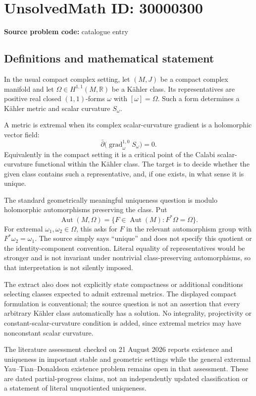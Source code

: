 \documentclass[11pt]{article}
\newcommand{\R}{\mathbb{R}}
\begin{document}
\section*{UnsolvedMath ID: 30000300}
\textbf{Source problem code:} catalogue entry
\subsection{Definitions and mathematical statement}
In the usual compact complex setting, let $(M,J)$ be a compact complex manifold and let $\Omega\in H^{1,1}(M,\R)$ be a K\"ahler class. Its representatives are positive real closed $(1,1)$-forms $\omega$ with $[\omega]=\Omega$. Such a form determines a K\"ahler metric and scalar curvature $S_\omega$.

A metric is extremal when its complex scalar-curvature gradient is a holomorphic vector field:
\[
 \bar\partial\bigl(\operatorname{grad}^{1,0}_{\omega}S_\omega\bigr)=0.
\]
Equivalently in the compact setting it is a critical point of the Calabi scalar-curvature functional within the K\"ahler class. The target is to decide whether the given class contains such a representative, and, if one exists, in what sense it is unique.

The standard geometrically meaningful uniqueness question is modulo holomorphic automorphisms preserving the class. Put
\[
 \operatorname{Aut}(M,\Omega)=\{F\in\operatorname{Aut}(M):F^*\Omega=\Omega\}.
\]
For extremal $\omega_1,\omega_2\in\Omega$, this asks for $F$ in the relevant automorphism group with $F^*\omega_2=\omega_1$. The source simply says ``unique'' and does not specify this quotient or the identity-component convention. Literal equality of representatives would be stronger and is not invariant under nontrivial class-preserving automorphisms, so that interpretation is not silently imposed.

The extract also does not explicitly state compactness or additional conditions selecting classes expected to admit extremal metrics. The displayed compact formulation is conventional; the source question is not an assertion that every arbitrary K\"ahler class automatically has a solution. No integrality, projectivity or constant-scalar-curvature condition is added, since extremal metrics may have nonconstant scalar curvature.

The literature assessment checked on 21 August 2026 reports existence and uniqueness in important stable and geometric settings while the general extremal Yau--Tian--Donaldson existence problem remains open in that assessment. These are dated partial-progress claims, not an independently updated classification or a statement of literal unquotiented uniqueness.
\end{document}
